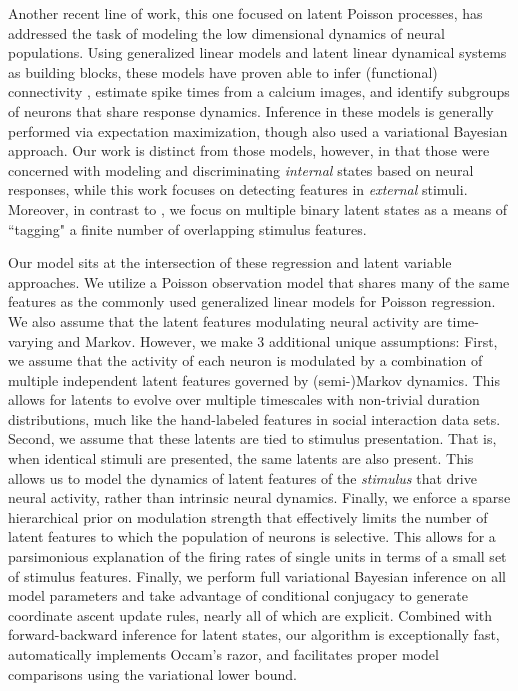 \documentclass[10pt,letterpaper]{article}
\begin{document}
Another recent line of work, this one focused on latent Poisson processes, has addressed the task of modeling the low dimensional dynamics of neural populations\cite{Pillow2008-em,Vogelstein2009-ax,Park2014-el,Buesing2014-ta,Archer2015-ec, Zhao2016-bw,Gao2016-ck}. Using generalized linear models and latent linear dynamical systems as building blocks, these models have proven able to infer (functional) connectivity \cite{Pillow2008-em}, estimate spike times from a calcium images\cite{Vogelstein2009-ax}, and identify subgroups of neurons that share response dynamics\cite{Buesing2014-ta,Zhao2016-bw,Gao2016-ck}. Inference in these models is generally performed via expectation maximization, though \cite{Ulrich2014-zc,Putzky2014-up,Archer2015-ec, Zhao2016-bw,Gao2016-ck} also used a variational Bayesian approach. Our work is distinct from those models, however, in that those were concerned with modeling and discriminating \emph{internal} states based on neural responses, while this work focuses on detecting features in \emph{external} stimuli. Moreover, in contrast to \cite{Buesing2014-ta,Archer2015-ec,Zhao2016-bw,Gao2016-ck}, we focus on multiple binary latent states as a means of ``tagging" a finite number of overlapping stimulus features.

Our model sits at the intersection of these regression and latent variable approaches. We utilize a Poisson observation model that shares many of the same features as the commonly used generalized linear models for Poisson regression. We also assume that the latent features modulating neural activity are time-varying and Markov. However, we make 3 additional unique assumptions: First, we assume that the activity of each neuron is modulated by a combination of multiple independent latent features governed by (semi-)Markov dynamics. This allows for latents to evolve over multiple timescales with non-trivial duration distributions, much like the hand-labeled features in social interaction data sets. Second, we assume that these latents are tied to stimulus presentation. That is, when identical stimuli are presented, the same latents are also present. This allows us to model the dynamics of latent features of the \emph{stimulus} that drive neural activity, rather than intrinsic neural dynamics. Finally, we enforce a sparse hierarchical prior on modulation strength that effectively limits the number of latent features to which the population of neurons is selective. This allows for a parsimonious explanation of the firing rates of single units in terms of a small set of stimulus features. Finally, we perform full variational Bayesian inference on all model parameters and take advantage of conditional conjugacy to generate coordinate ascent update rules, nearly all of which are explicit. Combined with forward-backward inference for latent states, our algorithm is exceptionally fast, automatically implements Occam's razor, and facilitates proper model comparisons using the variational lower bound.
\end{document}
